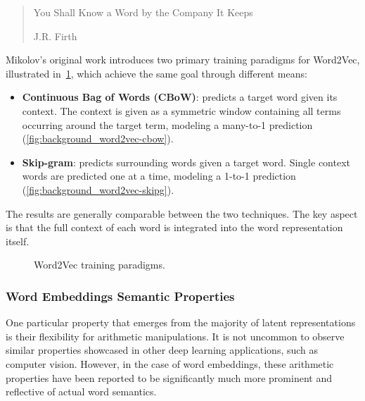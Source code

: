 \blockquote[J.R. Firth]{You Shall Know a Word by the Company It Keeps}

Mikolov's original work introduces two primary training paradigms for Word2Vec, illustrated in~\cref{fig:background_word2vec-cbow_word2vec-skipg}, which achieve the same goal through different means:
\begin{itemize}
    \item \textbf{Continuous Bag of Words (CBoW)}: predicts a target word given its context.
The context is given as a symmetric window containing all terms occurring around the target term, modeling a many-to-1 prediction (\cref{fig:background_word2vec-cbow}).
    \item \textbf{Skip-gram}: predicts surrounding words given a target word.
Single context words are predicted one at a time, modeling a 1-to-1 prediction (\cref{fig:background_word2vec-skipg}).
\end{itemize}
The results are generally comparable between the two techniques.
The key aspect is that the full context of each word is integrated into the word representation itself.

\begin{figure}[t!]
    \centering
    \quad
    \caption{Word2Vec training paradigms.}
    \label{fig:background_word2vec-cbow_word2vec-skipg}
\end{figure}

\subsubsection*{Word Embeddings Semantic Properties}

One particular property that emerges from the majority of latent representations is their flexibility for arithmetic manipulations.
It is not uncommon to observe similar properties showcased in other deep learning applications, such as computer vision.
However, in the case of word embeddings, these arithmetic properties have been reported to be significantly much more prominent and reflective of actual word semantics.

